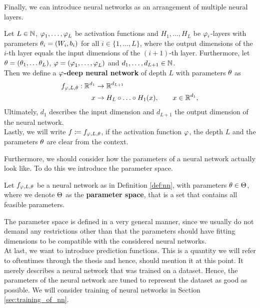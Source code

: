 Finally, we can introduce neural networks as an arrangement of multiple neural layers.


\begin{definition}\label{def:nn}
Let $L\in\operatorname{\mathbb{N}}$, $\operatorname{\varphi}_1,\ldots,\operatorname{\varphi}_L$ be activation functions and $H_1, \ldots, H_L$ be $\operatorname{\varphi}_i$-layers with parameters $\theta_i = (W_i, b_i)$ for all $i \in \{1,\ldots,L\}$, where the output dimensions of the $i$-th layer equals the input dimensions of the $(i+1)$-th layer. Furthermore, let  $\theta = (\theta_1, \ldots \theta_L)$, $\operatorname{\varphi} = (\operatorname{\varphi}_1, \ldots, \operatorname{\varphi}_L)$ and $d_1,\ldots,d_{L+1}\in\operatorname{\mathbb{N}}$.\\
Then we define a \textbf{$\operatorname{\varphi}$-deep neural network} of depth $L$ with parameters $\theta$ as
\begin{align}
f_{\operatorname{\varphi}, L, \theta}: \operatorname{\mathbb{R}}^{d_1} &\to \operatorname{\mathbb{R}}^{d_{L+1}}\nonumber\\
x &\to H_L \circ \ldots \circ H_1 (x), \qquad x \in \operatorname{\mathbb{R}}^{d_1},
\end{align}
Ultimately, $d_1$ describes the input dimension and $d_{L+1}$ the output dimension of the neural network.\\
Lastly, we will write $f\coloneqq f_{\operatorname{\varphi}, L, \theta}$, if the activation function $\operatorname{\varphi}$, the depth $L$ and the parameters $\theta$ are clear from the context.
\end{definition}

Furthermore, we should consider how the parameters of a neural network actually look like. To do this we introduce the parameter space.

\begin{definition}
Let $f_{\operatorname{\varphi}, L, \theta}$ be a neural network as in Definition \ref{def:nn}, with parameters $\theta\in\operatorname{\Theta}$, where we denote $\operatorname{\Theta}$ as the \textbf{parameter space}, that is a set that contains all feasible parameters.
\end{definition}

The parameter space is defined in a very general manner, since we usually do not demand any restrictions other than that the parameters should have fitting dimensions to be compatible with the considered neural networks.\\
At last, we want to introduce prediction functions. This is a quantity we will refer to oftentimes through the thesis and hence, should mention it at this point. It merely describes a neural network that was trained on a dataset. Hence, the parameters of the neural network are tuned to represent the dataset as good as possible. We will consider training of neural networks in Section \ref{sec:training_of_nn}.

